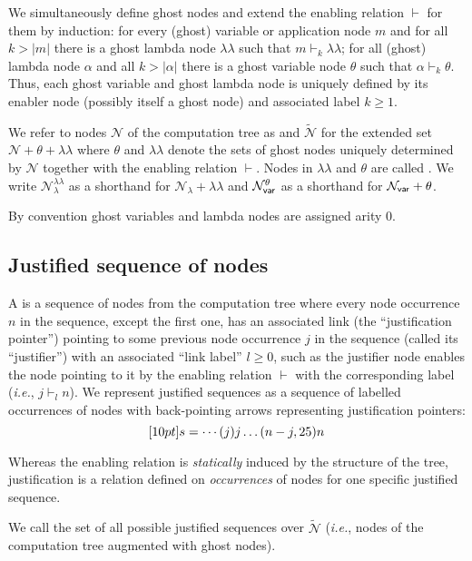 \documentclass{article}
\makeatletter
\theoremstyle{plain}
\theoremstyle{definition}
\theoremstyle{remark}
\newcommand\Nodes{\mathcal{N}}%
\newcommand\NodesVar{\Nodes_{\sf var}}%
\newcommand\NodesLmd{\Nodes_\lambda}%
\newcommand\ExtendedNodes{\tilde{\Nodes}}
\newcommand{\ghostlmd}{{\lambda\!\!\lambda}}
\newcommand{\ghostvar}{\theta}
\newcommand\ImNodesVar{\NodesVar^\ghostvar}
\newcommand\ImNodesLmd{\NodesLmd^\ghostlmd}
\newcommand{\enables}{\vdash} %
\renewcommand\ie{{\it i.e.\@\xspace}}
\makeatother
\begin{document}
We simultaneously define ghost nodes and extend the enabling relation $\enables$ for them by induction: for every (ghost) variable or application node $m$ and for all $k>|m|$ there is a ghost lambda node $\ghostlmd$ such that $m \enables_k \ghostlmd$; for all (ghost) lambda node $\alpha$ and all $k>|\alpha|$ there is a ghost variable node $\ghostvar$ such that $\alpha \enables_k \ghostvar$. Thus, each ghost variable and ghost lambda node is uniquely defined by its enabler node (possibly itself a ghost node) and associated label $k\geq 1$.

We refer to nodes $\Nodes$ of the computation tree as 
and $\ExtendedNodes$ for the extended set $\Nodes + \ghostvar + \ghostlmd$ where $\ghostvar$ and $\ghostlmd$ denote the sets of ghost nodes uniquely determined by $\Nodes$ together with the enabling relation $\enables$. Nodes in $\ghostlmd$ and $\ghostvar$ are called . We write $\ImNodesLmd$ as a shorthand for $\NodesLmd + \ghostlmd$ and $\ImNodesVar$ as a shorthand for $\NodesVar + \ghostvar$.

By convention ghost variables and lambda nodes are assigned arity $0$.

\subsection{Justified sequence of nodes}
\label{sec:justseq}

A  is a sequence of nodes from the computation tree where every node occurrence $n$ in the sequence, except the first one, has an associated link (the ``justification pointer'') pointing to some previous node occurrence $j$ in the sequence (called its ``justifier'') with an associated ``link label'' $l\geq0$, such as the justifier node enables the node pointing to it by the enabling relation $\enables$ with the corresponding label (\ie, $j \enables_l n$). We represent justified sequences as a sequence of labelled occurrences of nodes with back-pointing arrows representing justification pointers:
$$\Pstr[10pt]{ s = \cdots (j){j} \ldots (n-j,25){n} }$$

Whereas the enabling relation is \emph{statically} induced by the structure of the tree, justification is a relation defined on \emph{occurrences} of nodes for one specific justified sequence.

We call   the set of all possible
 justified sequences over $\ExtendedNodes$ (\ie, nodes of the computation tree augmented with ghost nodes).
\end{document}
